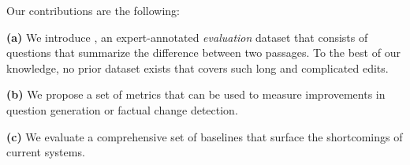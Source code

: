 

Our contributions are the following:

\noindent \textbf{(a)} We introduce \dataset{}, an expert-annotated \textit{evaluation} dataset that consists of questions that summarize the difference between two passages. To the best of our knowledge, no prior dataset exists that covers such long and complicated edits.


\noindent \textbf{(b)} We propose a set of metrics that can be used to measure improvements in question generation or factual change detection. 

\noindent \textbf{(c)} We evaluate a comprehensive set of baselines that surface the shortcomings of current systems.
